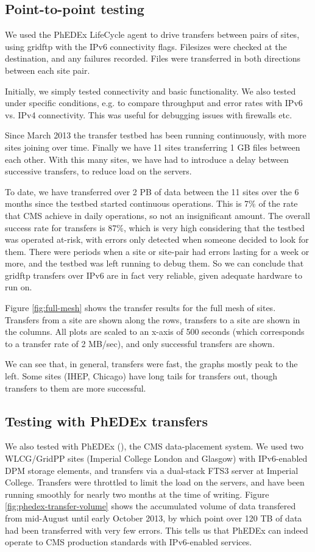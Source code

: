 \subsection{Point-to-point testing}

We used the PhEDEx LifeCycle agent \cite{LifeCycle} to drive transfers between pairs of sites, using gridftp with the IPv6 connectivity flags. Filesizes were checked at the destination, and any failures recorded. Files were transferred in both directions between each site pair.

Initially, we simply tested connectivity and basic functionality. We also tested under specific conditions, e.g. to compare throughput and error rates with IPv6 vs. IPv4 connectivity. This was useful for debugging issues with firewalls etc.

Since March 2013 the transfer testbed has been running continuously, with more sites joining over time. Finally we have 11 sites transferring 1 GB files between each other. With this many sites, we have had to introduce a delay between successive transfers, to reduce load on the servers.

To date, we have transferred over 2 PB of data between the 11 sites over the 6 months since the testbed started continuous operations. This is 7\% of the rate that CMS achieve in daily operations, so not an insignificant amount. The overall success rate for transfers is 87\%, which is very high considering that the testbed was operated at-risk, with errors only detected when someone decided to look for them.
There were periods when a site or site-pair had errors lasting for a week or more, and the testbed was left running to debug them. So we can conclude that gridftp transfers over IPv6 are in fact very reliable, given adequate hardware to run on.

Figure \ref{fig:full-mesh} shows the transfer results for the full mesh of sites. Transfers from a site are shown along the rows, transfers to a site are shown in the columns. All plots are scaled to an x-axis of 500 seconds (which corresponds to a transfer rate of 2 MB/sec), and only successful transfers are shown.

We can see that, in general, transfers were fast, the graphs mostly peak to the left. Some sites (IHEP, Chicago) have long tails for transfers out, though transfers to them are more successful.

\subsection{Testing with PhEDEx transfers}
We also tested with PhEDEx (\cite{PhEDEx}), the CMS data-placement system. We used two WLCG/GridPP sites (Imperial College London and Glasgow) with IPv6-enabled DPM storage elements, and transfers via a dual-stack FTS3 server at Imperial College. Transfers were throttled to limit the load on the servers, and have been running smoothly for nearly two months at the time of writing. Figure \ref{fig:phedex-transfer-volume} shows the accumulated volume of data transfered from mid-August until early October 2013, by which point over 120 TB of data had been transferred with very few errors. This tells us that PhEDEx can indeed operate to CMS production standards with IPv6-enabled services.


